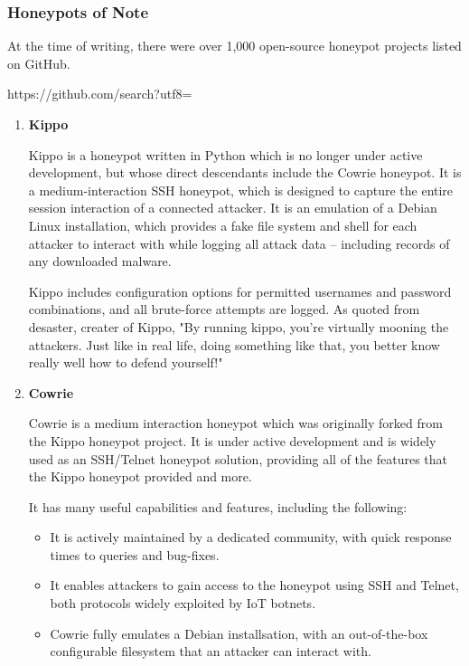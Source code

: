 \subsubsection{Honeypots of Note}

At the time of writing, there were over 1,000 open-source honeypot projects listed on GitHub. {https://github.com/search?utf8=%

\begin{enumerate}
	
	\item \textbf{Kippo}
	
	Kippo is a honeypot written in Python which is no longer under active development, but whose direct descendants include the Cowrie honeypot. It is a medium-interaction SSH honeypot, which is designed to capture the entire session interaction of a connected attacker. It is an emulation of a Debian Linux installation, which provides a fake file system and shell for each attacker to interact with while logging all attack data – including records of any downloaded malware. 
	
	Kippo includes configuration options for permitted usernames and password combinations, and all brute-force attempts are logged.
	As quoted from desaster, creater of Kippo, "By running kippo, you're virtually mooning the attackers. Just like in real life, doing something like that, you better know really well how to defend yourself!"
	
	
	\item \textbf{Cowrie}
	
	Cowrie is a medium interaction honeypot which was originally forked from the Kippo honeypot project. It is under active development and is widely used as an SSH/Telnet honeypot solution, providing all of the features that the Kippo honeypot provided and more. 
	
	It has many useful capabilities and features, including the following:
	
	\begin{itemize}
		\item It is actively maintained by a dedicated community, with quick response times to queries and bug-fixes.
		
		\item It enables attackers to gain access to the honeypot using SSH and Telnet, both protocols widely exploited by IoT botnets.
		
		\item Cowrie fully emulates a Debian installsation, with an out-of-the-box configurable filesystem that an attacker can interact with.
		

\end{itemize}
\end{enumerate}}
